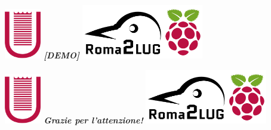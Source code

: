 \documentclass{beamer}
\begin{document}


\begin{frame}[plain]
\begin{center}
\includegraphics[width=0.12\textwidth]{imgs/logo-uniroma2-red.png}
\vfill
\huge{\textit{\textbf{[DEMO]}}}
\vfill
\includegraphics[width=0.40\textwidth]{imgs/logo02.png}
\end{center}
\end{frame}



\begin{frame}[plain]
\begin{center}
\includegraphics[width=0.12\textwidth]{imgs/logo-uniroma2-red.png}
\vfill
\huge{\textit{\textbf{Grazie per l'attenzione!}}}
\vfill
\includegraphics[width=0.40\textwidth]{imgs/logo02.png}
\end{center}
\end{frame}
\end{document}
